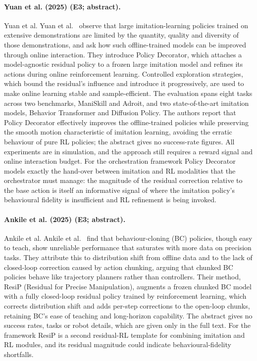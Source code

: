 \documentclass[10pt,a4paper]{article}
\begin{document}
\paragraph{Yuan et al. (2025) (E3; abstract).} Yuan et al. Yuan et al.~\cite{Yuan2025} observe that large imitation-learning policies trained on extensive demonstrations are limited by the quantity, quality and diversity of those demonstrations, and ask how such offline-trained models can be improved through online interaction. They introduce Policy Decorator, which attaches a model-agnostic residual policy to a frozen large imitation model and refines its actions during online reinforcement learning. Controlled exploration strategies, which bound the residual's influence and introduce it progressively, are used to make online learning stable and sample-efficient. The evaluation spans eight tasks across two benchmarks, ManiSkill and Adroit, and two state-of-the-art imitation models, Behavior Transformer and Diffusion Policy. The authors report that Policy Decorator effectively improves the offline-trained policies while preserving the smooth motion characteristic of imitation learning, avoiding the erratic behaviour of pure RL policies; the abstract gives no success-rate figures. All experiments are in simulation, and the approach still requires a reward signal and online interaction budget. For the orchestration framework Policy Decorator models exactly the hand-over between imitation and RL modalities that the orchestrator must manage: the magnitude of the residual correction relative to the base action is itself an informative signal of where the imitation policy's behavioural fidelity is insufficient and RL refinement is being invoked.

\paragraph{Ankile et al. (2025) (E3; abstract).} Ankile et al. Ankile et al.~\cite{Ankile2025} find that behaviour-cloning (BC) policies, though easy to teach, show unreliable performance that saturates with more data on precision tasks. They attribute this to distribution shift from offline data and to the lack of closed-loop correction caused by action chunking, arguing that chunked BC policies behave like trajectory planners rather than controllers. Their method, ResiP (Residual for Precise Manipulation), augments a frozen chunked BC model with a fully closed-loop residual policy trained by reinforcement learning, which corrects distribution shift and adds per-step corrections to the open-loop chunks, retaining BC's ease of teaching and long-horizon capability. The abstract gives no success rates, tasks or robot details, which are given only in the full text. For the framework ResiP is a second residual-RL template for combining imitation and RL modules, and its residual magnitude could indicate behavioural-fidelity shortfalls.
\end{document}
